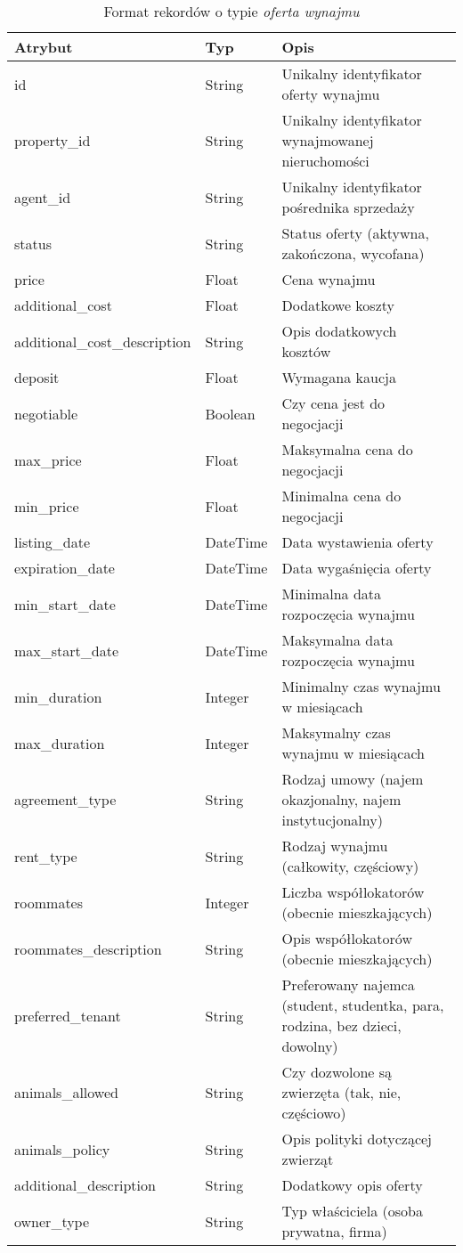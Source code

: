 \begin{table}[H]
    \caption{Format rekordów o typie \textit{oferta wynajmu}}
    \centering
    \begin{tabular}{|l|l|l|}
    \hline
    \textbf{Atrybut} & \textbf{Typ} & \textbf{Opis} \\
    \hline
    id & String & Unikalny identyfikator oferty wynajmu \\
    property\_id & String & Unikalny identyfikator wynajmowanej nieruchomości \\
    agent\_id & String & Unikalny identyfikator pośrednika sprzedaży \\
    status & String & Status oferty (aktywna, zakończona, wycofana) \\
    price & Float & Cena wynajmu \\
    additional\_cost & Float & Dodatkowe koszty \\
    additional\_cost\_description & String & Opis dodatkowych kosztów \\
    deposit & Float & Wymagana kaucja \\
    negotiable & Boolean & Czy cena jest do negocjacji \\    
    max\_price & Float & Maksymalna cena do negocjacji \\
    min\_price & Float & Minimalna cena do negocjacji \\
    listing\_date & DateTime & Data wystawienia oferty \\
    expiration\_date & DateTime & Data wygaśnięcia oferty \\
    min\_start\_date & DateTime & Minimalna data rozpoczęcia wynajmu \\
    max\_start\_date & DateTime & Maksymalna data rozpoczęcia wynajmu \\
    min\_duration & Integer & Minimalny czas wynajmu w miesiącach \\
    max\_duration & Integer & Maksymalny czas wynajmu w miesiącach \\
    agreement\_type & String & Rodzaj umowy (najem okazjonalny, najem instytucjonalny) \\
    rent\_type & String & Rodzaj wynajmu (całkowity, częściowy) \\
    roommates & Integer & Liczba współlokatorów (obecnie mieszkających) \\
    roommates\_description & String & Opis współlokatorów (obecnie mieszkających) \\
    preferred\_tenant & String & Preferowany najemca (student, studentka, para, rodzina, bez dzieci, dowolny) \\
    animals\_allowed & String & Czy dozwolone są zwierzęta (tak, nie, częściowo) \\
    animals\_policy & String & Opis polityki dotyczącej zwierząt \\
    additional\_description & String & Dodatkowy opis oferty \\
    owner\_type & String & Typ właściciela (osoba prywatna, firma) \\
    \hline
    \end{tabular}
    \label{tab:sell_offer_details}
\end{table}


